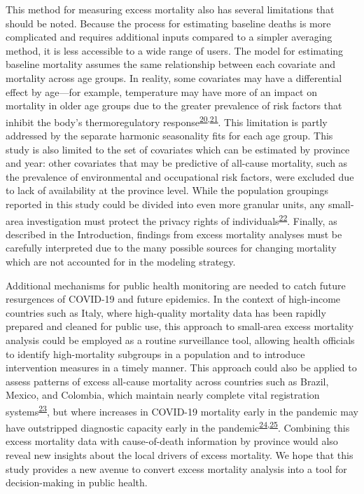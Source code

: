 \documentclass[
]{article}
\begin{document}
This method for measuring excess mortality also has several limitations that should be noted. Because the process for estimating baseline deaths is more complicated and requires additional inputs compared to a simpler averaging method, it is less accessible to a wide range of users. The model for estimating baseline mortality assumes the same relationship between each covariate and mortality across age groups. In reality, some covariates may have a differential effect by age---for example, temperature may have more of an impact on mortality in older age groups due to the greater prevalence of risk factors that inhibit the body's thermoregulatory response\textsuperscript{\protect\hyperlink{ref-Yu2010}{20},\protect\hyperlink{ref-Stafoggia2008}{21}}⁠. This limitation is partly addressed by the separate harmonic seasonality fits for each age group. This study is also limited to the set of covariates which can be estimated by province and year: other covariates that may be predictive of all-cause mortality, such as the prevalence of environmental and occupational risk factors, were excluded due to lack of availability at the province level. While the population groupings reported in this study could be divided into even more granular units, any small-area investigation must protect the privacy rights of individuals\textsuperscript{\protect\hyperlink{ref-Bayer2000}{22}}⁠. Finally, as described in the Introduction, findings from excess mortality analyses must be carefully interpreted due to the many possible sources for changing mortality which are not accounted for in the modeling strategy.

Additional mechanisms for public health monitoring are needed to catch future resurgences of COVID-19 and future epidemics. In the context of high-income countries such as Italy, where high-quality mortality data has been rapidly prepared and cleaned for public use, this approach to small-area excess mortality analysis could be employed as a routine surveillance tool, allowing health officials to identify high-mortality subgroups in a population and to introduce intervention measures in a timely manner. This approach could also be applied to assess patterns of excess all-cause mortality across countries such as Brazil, Mexico, and Colombia, which maintain nearly complete vital registration systems\textsuperscript{\protect\hyperlink{ref-GBD2019DemographicsCollaborators2020}{23}}⁠, but where increases in COVID-19 mortality early in the pandemic may have outstripped diagnostic capacity early in the pandemic\textsuperscript{\protect\hyperlink{ref-LeonCabrera2020}{24},\protect\hyperlink{ref-Burki2020}{25}}⁠. Combining this excess mortality data with cause-of-death information by province would also reveal new insights about the local drivers of excess mortality. We hope that this study provides a new avenue to convert excess mortality analysis into a tool for decision-making in public health.
\end{document}
